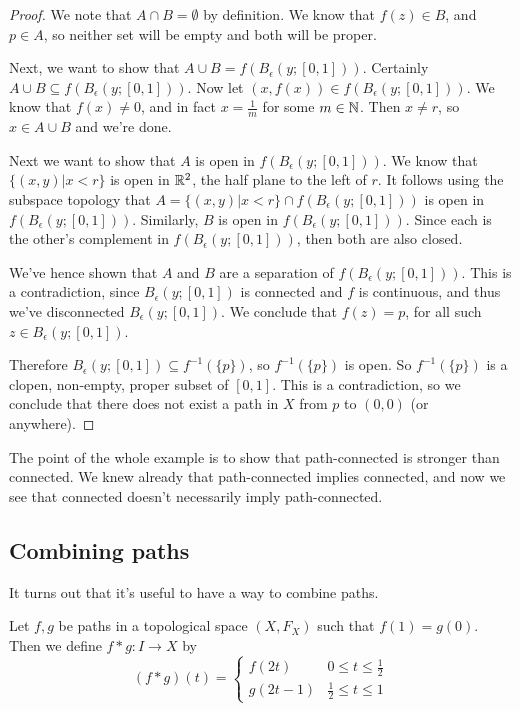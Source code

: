 \begin{proof}
We note that $A\cap B = \emptyset$ by definition. We know that $f(z)\in B$, and $p\in A$, so neither set will be empty and both will be proper.

Next, we want to show that $A\cup B = f\left( B_\epsilon (y;[0,1]) \right)$. Certainly $A\cup B \subseteq f\left( B_{\epsilon} (y;[0,1]) \right)$. Now let $(x, f(x)) \in f\left( B_{\epsilon} (y;[0,1]) \right)$. We know that $f(x) \neq 0$, and in fact $x = \frac{1}{m}$ for some $m\in \mathbb N$. Then $x\neq r$, so $x\in A\cup B$ and we're done.

Next we want to show that $A$ is open in $f(B_{\epsilon} (y;[0,1]))$. We know that $\{(x,y) | x<r \}$ is open in $\mathbb R^2$, the half plane to the left of $r$. It follows using the subspace topology that $A = \{ (x,y) | x< r \} \cap f\left( B_{\epsilon} (y;[0,1]) \right)$ is open in $f\left( B_{\epsilon} (y;[0,1] ) \right)$. Similarly, $B$ is open in $f\left( B_{\epsilon} (y;[0,1] ) \right)$. Since each is the other's complement in $f\left( B_{\epsilon} (y;[0,1] ) \right)$, then both are also closed.

We've hence shown that $A$ and $B$ are a separation of $f\left( B_{\epsilon} (y;[0,1] ) \right)$. This is a contradiction, since $B_{\epsilon} (y;[0,1])$ is connected and $f$ is continuous, and thus we've disconnected $B_{\epsilon}(y;[0,1])$. We conclude that $f(z) = p$, for all such $z\in B_{\epsilon}(y;[0,1])$. 

Therefore $B_{\epsilon} (y;[0,1]) \subseteq f^{-1}(\{ p\})$, so $f^{-1} (\{p\})$ is open. So $f^{-1}( \{ p \} )$ is a clopen, non-empty, proper subset of $[0,1]$. This is a contradiction, so we conclude that there does not exist a path in $X$ from $p$ to $(0,0)$ (or anywhere). 
\end{proof}

The point of the whole example is to show that path-connected is stronger than connected. We knew already that path-connected implies connected, and now we see that connected doesn't necessarily imply path-connected.

\subsection{Combining paths} It turns out that it's useful to have a way to combine paths. 
\begin{definition}
Let $f,g$ be paths in a topological space $(X,F_X)$ such that $f(1) = g(0)$. Then we define $f\ast g : I \to X$ by
\[ (f\ast g )(t) = 
\begin{cases}
f(2t) & 0 \leq t\leq \frac{1}{2} \\
g(2t-1) & \frac{1}{2} \leq t \leq 1 
\end{cases}
\]
\end{definition}

